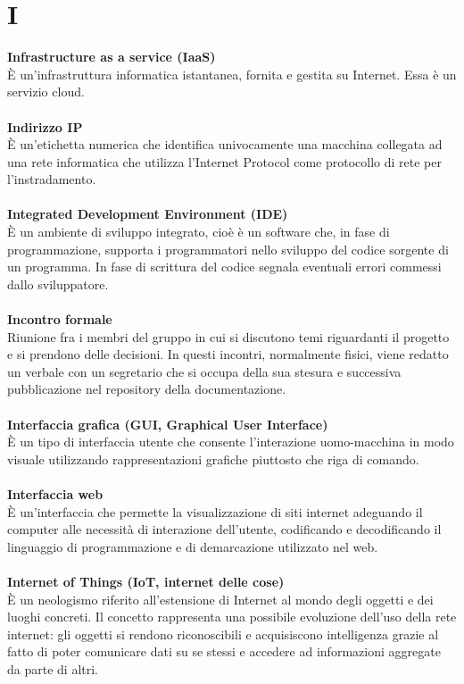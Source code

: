 \section{I}
\textbf{Infrastructure as a service (IaaS)}\\ 
È un'infrastruttura informatica istantanea, fornita e gestita su Internet. Essa è un servizio cloud. \\ \\
\textbf{Indirizzo IP}\\
È un'etichetta numerica che identifica univocamente una macchina collegata ad una rete informatica che utilizza l'Internet Protocol come protocollo di rete per l'instradamento. \\ \\
\textbf{Integrated Development Environment (IDE)}\\
È un ambiente di sviluppo integrato, cioè è un software che, in fase di programmazione, supporta i programmatori nello sviluppo del codice sorgente di un programma. In fase di scrittura del codice segnala eventuali errori commessi dallo sviluppatore. \\ \\
\textbf{Incontro formale}\\
Riunione fra i membri del gruppo in cui si discutono temi riguardanti il progetto e si prendono delle decisioni.
In questi incontri, normalmente fisici, viene redatto un verbale con un segretario che si occupa della sua stesura e successiva pubblicazione nel repository della documentazione. \\ \\
\textbf{Interfaccia grafica (GUI, Graphical User Interface)}\\
È un tipo di interfaccia utente che consente l'interazione uomo-macchina in modo visuale utilizzando rappresentazioni grafiche piuttosto che riga di comando. \\ \\
\textbf{Interfaccia web}\\
È un'interfaccia che permette la visualizzazione di siti internet adeguando il computer alle necessità di interazione dell'utente, codificando e decodificando il linguaggio di programmazione e di demarcazione utilizzato nel web. \\ \\
\textbf{Internet of Things (IoT, internet delle cose)}\\
È un neologismo riferito all'estensione di Internet al mondo degli oggetti e dei luoghi concreti. Il concetto rappresenta una possibile evoluzione dell'uso della rete internet: gli oggetti si rendono riconoscibili e acquisiscono intelligenza grazie al fatto di poter comunicare dati su se stessi e accedere ad informazioni aggregate da parte di altri. \\ \\
\clearpage
